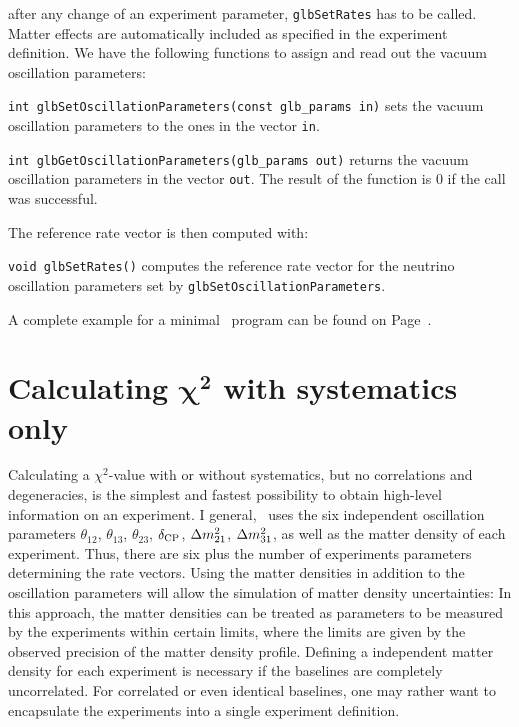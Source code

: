 after any change of an experiment parameter, {\tt glbSetRates} has to be called. Matter effects are automatically included as specified in the experiment definition. We have the following functions to assign and
read out the vacuum oscillation parameters:
\begin{function}
{\tt int glbSetOscillationParameters(const glb\_params in)} sets the
vacuum oscillation parameters to the ones in the vector {\tt in}.
\end{function}
\begin{function}
{\tt int glbGetOscillationParameters(glb\_params out)} returns the
vacuum oscillation parameters in the vector {\tt out}. The result of
the function is $0$ if the call was successful.
\end{function}
The reference rate vector is then computed with:
\begin{function}
{\tt void glbSetRates()} computes the reference rate vector for the neutrino oscillation parameters set by {\tt glbSetOscillationParameters}. 
\end{function}
A complete example for a minimal \GLOBES\ program can be found on
Page~\pageref{ex:c}.

\chapter[Calculating $\chi^2$ with systematics only]{Calculating $\boldsymbol{\chi^2}$ with systematics only}

Calculating a $\chi^2$-value with or without systematics, but no correlations and degeneracies, is the simplest and fastest possibility to obtain high-level information on an experiment. I general, \GLOBES\ uses the six independent oscillation parameters $\theta_{12}$, $\theta_{13}$, $\theta_{23}$, $\delta_{\mathrm{CP}}$, $\Delta m_{21}^2$, $\Delta m_{31}^2$, as well as the matter density of each experiment. Thus, there are six plus the number of experiments parameters determining the rate vectors. Using the matter densities in addition to the oscillation parameters will allow the simulation of matter density uncertainties: In this approach, the matter densities can be treated as parameters to be measured by the experiments within certain limits, where the limits are given by the observed precision of the matter density profile. Defining a independent matter density for each experiment is necessary if the baselines are completely uncorrelated. For correlated or even identical baselines, one may rather want to encapsulate the experiments into a single experiment definition. 

